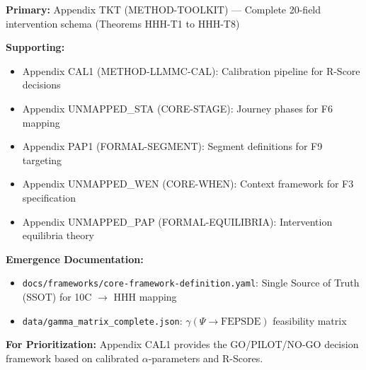 \begin{tcolorbox}[colback=blue!5!white, colframe=blue!75!black,
    title=Appendix References]
\textbf{Primary:} Appendix TKT (METHOD-TOOLKIT) --- Complete 20-field intervention schema (Theorems HHH-T1 to HHH-T8)

\textbf{Supporting:}
\begin{itemize}[nosep]
\item Appendix CAL1 (METHOD-LLMMC-CAL): Calibration pipeline for R-Score decisions
\item Appendix UNMAPPED_STA (CORE-STAGE): Journey phases for F6 mapping
\item Appendix PAP1 (FORMAL-SEGMENT): Segment definitions for F9 targeting
\item Appendix UNMAPPED_WEN (CORE-WHEN): Context framework for F3 specification
\item Appendix UNMAPPED_PAP (FORMAL-EQUILIBRIA): Intervention equilibria theory
\end{itemize}

\textbf{Emergence Documentation:}
\begin{itemize}[nosep]
\item \texttt{docs/frameworks/core-framework-definition.yaml}: Single Source of Truth (SSOT) for 10C $\rightarrow$ HHH mapping
\item \texttt{data/gamma\_matrix\_complete.json}: $\gamma(\Psi \rightarrow \text{FEPSDE})$ feasibility matrix
\end{itemize}

\textbf{For Prioritization:} Appendix CAL1 provides the GO/PILOT/NO-GO decision framework
based on calibrated $\alpha$-parameters and R-Scores.
\end{tcolorbox}


